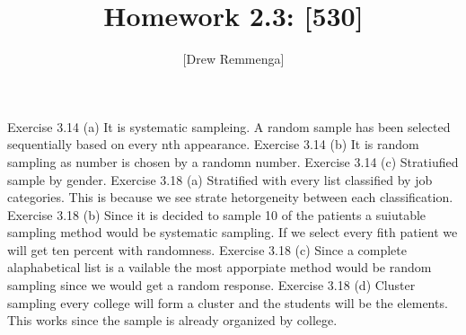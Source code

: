 \documentclass[10pt, oneside]{article}
\title{Homework 2.3: [530]}
\author{[Drew Remmenga]}
\begin{document}
\maketitle
\pagebreak
Exercise 3.14 (a)
It is systematic sampleing. A random sample has been selected sequentially based on every nth appearance. 
\clearpage
Exercise 3.14 (b)
It is random sampling as number is chosen by a randomn number. 
\clearpage
Exercise 3.14 (c)
Stratiufied sample by gender.
\clearpage
Exercise 3.18 (a)
Stratified with every list classified by job categories. This is because we see strate hetorgeneity between each classification. 
\clearpage
Exercise 3.18 (b)
Since it is decided to sample 10 of the patients a suiutable sampling method would be systematic sampling. If we select every fith patient we will get ten percent with randomness. 
\clearpage
Exercise 3.18 (c)
Since a complete alaphabetical list is a vailable the most apporpiate method would be random sampling since we would get a random response. 
\clearpage
Exercise 3.18 (d)
Cluster sampling every college will form a cluster and the students will be the elements. This works since the sample is already organized by college. 
\end{document}
